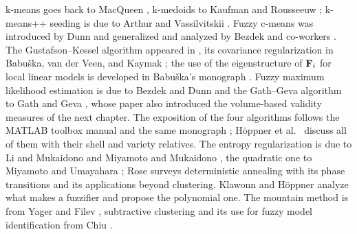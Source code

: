 k-means goes back to MacQueen \cite{macqueen:1967:kmeans}, k-medoids to Kaufman and Rousseeuw \cite{kaufman:1990:groups}; k-means++ seeding is due to Arthur and Vassilvitskii \cite{arthur:2007:kmeanspp}. Fuzzy c-means was introduced by Dunn \cite{dunn:1973:fcm} and generalized and analyzed by Bezdek and co-workers \cite{bezdek:1981,bezdek:1980:convergence,bezdek:1984:fcm,bezdek:1987:convergence}. The Gustafson--Kessel algorithm appeared in \cite{gustafson:1979}, its covariance regularization in Babu\v{s}ka, van der Veen, and Kaymak \cite{babuska:2002:covariance}; the use of the eigenstructure of $\mathbf{F}_i$ for local linear models is developed in Babu\v{s}ka's monograph \cite{babuska:1998:book}. Fuzzy maximum likelihood estimation is due to Bezdek and Dunn \cite{bezdek:1975:fmle} and the Gath--Geva algorithm to Gath and Geva \cite{gath:1989}, whose paper also introduced the volume-based validity measures of the next chapter. The exposition of the four algorithms follows the MATLAB toolbox manual \cite{balasko:2005:toolbox} and the same monograph \cite{babuska:1998:book}; H\"oppner et al.\ \cite{hoppner:1999:book} discuss all of them with their shell and variety relatives. The entropy regularization is due to Li and Mukaidono \cite{li:1995:entropy} and Miyamoto and Mukaidono \cite{miyamoto:1997:entropy}, the quadratic one to Miyamoto and Umayahara \cite{miyamoto:1998:quadratic}; Rose \cite{rose:1998:annealing} surveys deterministic annealing with its phase transitions and its applications beyond clustering. Klawonn and H\"oppner \cite{klawonn:2003:fuzzifier} analyze what makes a fuzzifier and propose the polynomial one. The mountain method is from Yager and Filev \cite{yager:1994:mountain}, subtractive clustering and its use for fuzzy model identification from Chiu \cite{chiu:1994:subtractive}.
